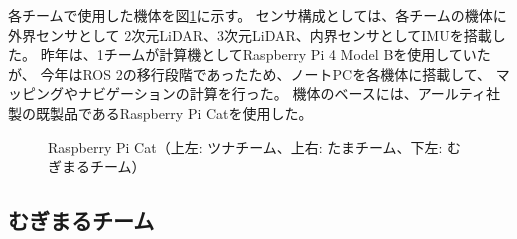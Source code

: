 \documentclass[twocolumn,9pt]{jsproceedings}
\begin{document}
各チームで使用した機体を図\ref{fig:raspicat}に示す。
センサ構成としては、各チームの機体に外界センサとして
2次元LiDAR、3次元LiDAR、内界センサとしてIMUを搭載した。
昨年は、1チームが計算機としてRaspberry Pi 4 Model Bを使用していたが\cite{池邉2022}、
今年はROS 2の移行段階であったため、ノートPCを各機体に搭載して、
マッピングやナビゲーションの計算を行った。
機体のベースには、アールティ社製の既製品であるRaspberry Pi Cat\cite{RTshop}を使用した。

\begin{figure}[h]
  \begin{center}
    \caption{Raspberry Pi Cat（上左: ツナチーム、上右: たまチーム、下左: むぎまるチーム）}
    \label{fig:raspicat}
  \end{center}
\end{figure}



\subsection{むぎまるチーム}
\end{document}
